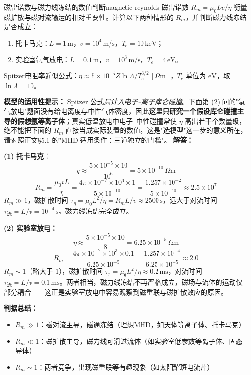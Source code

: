 \begin{example}{磁雷诺数与磁力线冻结的数值判断}{magnetic-reynolds}
磁雷诺数 $R_m = \mu_0 L v / \eta$ 衡量磁扩散与磁对流输运的相对重要性。计算以下两种情形的 $R_m$，并判断磁力线冻结是否成立：
\begin{enumerate}[label=(\arabic*)]
\item 托卡马克：$L=1\,\mathrm{m}$，$v=10^4\,\mathrm{m/s}$，$T_e=10\,\mathrm{keV}$；
\item 实验室氩气放电：$L=0.1\,\mathrm{m}$，$v=10^3\,\mathrm{m/s}$，$T_e=4\,\mathrm{eV}$。
\end{enumerate}
Spitzer电阻率近似公式：$\eta \approx 5\times 10^{-5} Z\ln\Lambda / T_e^{3/2}\,[\Omega\mathrm{m}]$，$T_e$ 单位为 $\mathrm{eV}$，取 $\ln\Lambda=10$。

\textbf{模型的适用性提示：} Spitzer 公式\emph{只计入电子--离子库仑碰撞}。下面第 (2) 问的"氩气放电"题面没有给电离度与中性气体密度，因此\textbf{这里只研究一个假设库仑碰撞主导的假想氩等离子体}；真实低温放电中电子--中性碰撞常使 $\eta$ 高出若干个数量级，绝不能把下面的 $R_m$ 直接当成实际装置的数值。这是"选模型"这一步的意义所在，请对照正文\S5.1 的"MHD 适用条件：三道独立的门槛"。
\tcblower
\textbf{解答：}

\textbf{(1) 托卡马克：}
\[
\eta \approx \frac{5\times 10^{-5}\times 10}{10^6} = 5\times 10^{-10}\,\Omega\mathrm{m}
\]
\[
R_m = \frac{\mu_0 v L}{\eta} = \frac{4\pi\times 10^{-7}\times 10^4\times 1}{5\times 10^{-10}} = \frac{1.257\times 10^{-2}}{5\times 10^{-10}} \approx 2.5\times 10^7
\]
$R_m \gg 1$，磁扩散时间 $\tau_\eta = \mu_0 L^2/\eta = R_m L/v \approx 2500\,\mathrm{s}$，远大于对流时间 $\tau_{\text{流}} = L/v = 10^{-4}\,\mathrm{s}$。磁力线冻结完全成立。

\textbf{(2) 实验室放电：}
\[
\eta \approx \frac{5\times 10^{-5}\times 10}{8} = 6.25\times 10^{-5}\,\Omega\mathrm{m}
\]
\[
R_m = \frac{4\pi\times 10^{-7}\times 10^3\times 0.1}{6.25\times 10^{-5}} = \frac{1.257\times 10^{-4}}{6.25\times 10^{-5}} \approx 2.0
\]
$R_m \sim 1$（略大于 1），磁扩散时间 $\tau_\eta = \mu_0 L^2/\eta \approx 0.2\,\mathrm{ms}$，对流时间 $\tau_{\text{流}} = L/v = 0.1\,\mathrm{ms}$。两者相当，磁力线冻结不再严格成立，磁场与流体的运动仅部分耦合——这正是实验室放电中容易观察到磁重联与磁扩散效应的原因。

\textbf{判据总结：}
\begin{itemize}[leftmargin=*,itemsep=0pt]
\item $R_m \gg 1$：磁对流主导，磁通冻结（理想MHD，如天体等离子体、托卡马克）
\item $R_m \ll 1$：磁扩散主导，磁力线可滑过流体（如实验室低参数等离子体、固态导体）
\item $R_m \sim 1$：两者竞争，出现磁重联等有趣现象（如太阳耀斑电流片）
\end{itemize}
\end{example}

